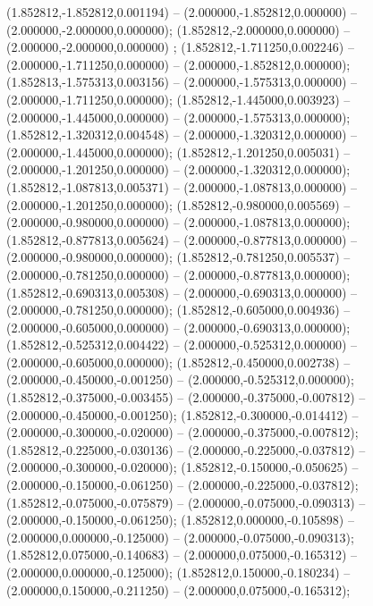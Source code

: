  (1.852812,-1.852812,0.001194) -- (2.000000,-1.852812,0.000000) -- (2.000000,-2.000000,0.000000);
 (1.852812,-2.000000,0.000000) -- (2.000000,-2.000000,0.000000) ;
 (1.852812,-1.711250,0.002246) -- (2.000000,-1.711250,0.000000) -- (2.000000,-1.852812,0.000000);
 (1.852813,-1.575313,0.003156) -- (2.000000,-1.575313,0.000000) -- (2.000000,-1.711250,0.000000);
 (1.852812,-1.445000,0.003923) -- (2.000000,-1.445000,0.000000) -- (2.000000,-1.575313,0.000000);
 (1.852812,-1.320312,0.004548) -- (2.000000,-1.320312,0.000000) -- (2.000000,-1.445000,0.000000);
 (1.852812,-1.201250,0.005031) -- (2.000000,-1.201250,0.000000) -- (2.000000,-1.320312,0.000000);
 (1.852812,-1.087813,0.005371) -- (2.000000,-1.087813,0.000000) -- (2.000000,-1.201250,0.000000);
 (1.852812,-0.980000,0.005569) -- (2.000000,-0.980000,0.000000) -- (2.000000,-1.087813,0.000000);
 (1.852812,-0.877813,0.005624) -- (2.000000,-0.877813,0.000000) -- (2.000000,-0.980000,0.000000);
 (1.852812,-0.781250,0.005537) -- (2.000000,-0.781250,0.000000) -- (2.000000,-0.877813,0.000000);
 (1.852812,-0.690313,0.005308) -- (2.000000,-0.690313,0.000000) -- (2.000000,-0.781250,0.000000);
 (1.852812,-0.605000,0.004936) -- (2.000000,-0.605000,0.000000) -- (2.000000,-0.690313,0.000000);
 (1.852812,-0.525312,0.004422) -- (2.000000,-0.525312,0.000000) -- (2.000000,-0.605000,0.000000);
 (1.852812,-0.450000,0.002738) -- (2.000000,-0.450000,-0.001250) -- (2.000000,-0.525312,0.000000);
 (1.852812,-0.375000,-0.003455) -- (2.000000,-0.375000,-0.007812) -- (2.000000,-0.450000,-0.001250);
 (1.852812,-0.300000,-0.014412) -- (2.000000,-0.300000,-0.020000) -- (2.000000,-0.375000,-0.007812);
 (1.852812,-0.225000,-0.030136) -- (2.000000,-0.225000,-0.037812) -- (2.000000,-0.300000,-0.020000);
 (1.852812,-0.150000,-0.050625) -- (2.000000,-0.150000,-0.061250) -- (2.000000,-0.225000,-0.037812);
 (1.852812,-0.075000,-0.075879) -- (2.000000,-0.075000,-0.090313) -- (2.000000,-0.150000,-0.061250);
 (1.852812,0.000000,-0.105898) -- (2.000000,0.000000,-0.125000) -- (2.000000,-0.075000,-0.090313);
 (1.852812,0.075000,-0.140683) -- (2.000000,0.075000,-0.165312) -- (2.000000,0.000000,-0.125000);
 (1.852812,0.150000,-0.180234) -- (2.000000,0.150000,-0.211250) -- (2.000000,0.075000,-0.165312);
